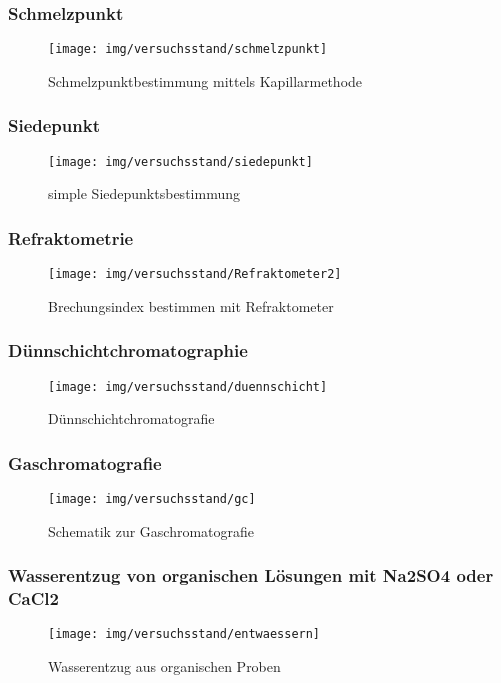 \subsubsection*{Schmelzpunkt}
\begin{figure}[h!]
	\centering
	\texttt{[image: img/versuchsstand/schmelzpunkt]}
	\caption{Schmelzpunktbestimmung mittels Kapillarmethode}
	\label{fig:schmelzpunkt}
\end{figure}
\FloatBarrier

\subsubsection*{Siedepunkt}
\begin{figure}[h!]
	\centering
	\texttt{[image: img/versuchsstand/siedepunkt]}
	\caption{simple Siedepunktsbestimmung}
	\label{fig:siedepunkt}
\end{figure}
\FloatBarrier

\subsubsection*{Refraktometrie}
\begin{figure}[h!]
	\centering
	\texttt{[image: img/versuchsstand/Refraktometer2]}
	\caption{Brechungsindex bestimmen mit Refraktometer}
	\label{fig:refraktometrie}
\end{figure}
\FloatBarrier

\subsubsection*{Dünnschichtchromatographie}
\begin{figure}[h!]
	\centering
	\texttt{[image: img/versuchsstand/duennschicht]}
	\caption{Dünnschichtchromatografie}
	\label{fig:duennschicht}
\end{figure}
\FloatBarrier

\subsubsection*{Gaschromatografie}
\begin{figure}[h!]
	\centering
	\texttt{[image: img/versuchsstand/gc]}
	\caption{Schematik zur Gaschromatografie}
	\label{fig:gc}
\end{figure}
\FloatBarrier

\subsubsection*{Wasserentzug von organischen Lösungen mit Na2SO4 oder CaCl2}
\begin{figure}[h!]
	\centering
	\texttt{[image: img/versuchsstand/entwaessern]}
	\caption{Wasserentzug aus organischen Proben}
	\label{fig:entwaessern}
\end{figure}
\FloatBarrier

